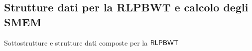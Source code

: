 \documentclass[]{beamer}
\def\SLP{\mbox{\rm {\sf SLP}}}
\def\rank{\mbox{\rm {\sf rank}}}
\def\LCE{\mbox{\rm {\sf LCE}}}
\def\PBWT{\mbox{\rm {\sf PBWT}}}
\def\RLPBWT{\mbox{\rm {\sf RLPBWT}}}
\def\LCE{\mbox{\rm {\sf LCE}}}
\begin{document}
\subsection{Strutture dati per la RLPBWT e calcolo degli SMEM}
\begin{frame}{Sottostrutture e strutture dati composte per la $\RLPBWT$}
\end{frame}
\end{document}
